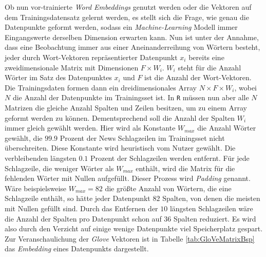 \documentclass[a4paper,11pt]{article}
\begin{document}
Ob nun vor-trainierte \textit{Word Embeddings} genutzt werden oder die Vektoren auf dem Trainingsdatensatz gelernt werden, es stellt sich die Frage, wie genau die Datenpunkte geformt werden, sodass ein \textit{Machine-Learning} Modell immer Eingangswerte derselben Dimension erwarten kann. Nun ist unter der Annahme, dass eine Beobachtung immer aus einer Aneinanderreihung von Wörtern besteht, jeder durch Wort-Vektoren repräsentierter Datenpunkt $x_i$ bereits eine zweidimensionale Matrix mit Dimensionen $F \times  W_i$. $W_i$ steht für die Anzahl Wörter im Satz des Datenpunktes $x_i$ und $F$ ist die Anzahl der Wort-Vektoren. Die Trainingsdaten formen dann ein dreidimensionales Array $N \times F \times  W_i$, wobei $N$ die Anzahl der Datenpunkte im Trainingsset ist. In \texttt{R} müssen nun aber alle $N$ Matrizen die gleiche Anzahl Spalten und Zeilen besitzen, um zu einem Array geformt werden zu können.
Dementsprechend soll die Anzahl der Spalten $W_i$ immer gleich gewählt werden. Hier wird als Konstante $W_{max}$ die Anzahl Wörter gewählt, die $99.9$ Prozent der News Schlagzeilen im Trainingsset nicht überschreiten. Diese Konstante wird heuristisch vom Nutzer gewählt. Die verbleibenden längsten $0.1$ Prozent der Schlagzeilen werden entfernt.
Für jede Schlagzeile, die weniger Wörter als $W_{max}$ enthält, wird die Matrix für die fehlenden Wörter mit Nullen aufgefüllt. Dieser Prozess wird \textit{Padding} genannt. Wäre beispielsweise $W_{max} = 82$ die größte Anzahl von Wörtern, die eine Schlagzeile enthält, so hätte jeder Datenpunkt $82$ Spalten, von denen die meisten mit Nullen gefüllt sind. Durch das Entfernen der $10$ längsten Schlagzeilen wäre die Anzahl der Spalten pro Datenpunkt schon auf $36$ Spalten reduziert. Es wird also durch den Verzicht auf einige wenige Datenpunkte viel Speicherplatz gespart.\\
Zur Veranschaulichung der \textit{Glove} Vektoren ist in Tabelle \ref{tab:GloVeMatrixBsp} das \textit{Embedding} eines Datenpunkts dargestellt.
\end{document}
